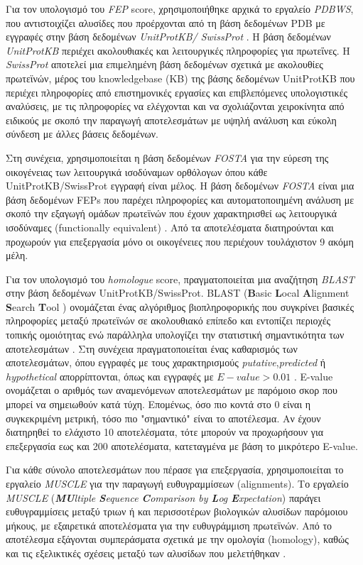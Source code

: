 \begin{itemize}
    \medskip
    Για τον υπολογισμό του \textit{FEP} score, χρησιμοποιήθηκε αρχικά το εργαλείο \textit{PDBWS}, που αντιστοιχίζει αλυσίδες που προέρχονται από τη βάση δεδομένων PDB με εγγραφές στην βάση δεδομένων \textit{UnitProtKB/ SwissProt} \cite{Martin2005}. Η βάση δεδομένων \textit{UnitProtKB} περιέχει ακολουθιακές και λειτουργικές πληροφορίες για πρωτεΐνες. Η \textit{SwissProt} αποτελεί μια επιμελημένη βάση δεδομένων σχετικά με ακολουθίες πρωτεϊνών, μέρος του knowledgebase (KB) της βάσης δεδομένων UnitProtKB που περιέχει πληροφορίες από επιστημονικές εργασίες και επιβλεπόμενες υπολογιστικές αναλύσεις, με τις πληροφορίες να ελέγχονται και να σχολιάζονται χειροκίνητα από ειδικούς με σκοπό την παραγωγή αποτελεσμάτων με υψηλή ανάλυση και εύκολη σύνδεση με άλλες βάσεις δεδομένων. 
    
    Στη συνέχεια, χρησιμοποιείται η βάση δεδομένων \textit{FOSTA} για την εύρεση της οικογένειας των λειτουργικά ισοδύναμων ορθόλογων όπου κάθε UnitProtKB/SwissProt εγγραφή είναι μέλος. Η βάση δεδομένων \textit{FOSTA} είναι μια βάση δεδομένων FEPs που παρέχει πληροφορίες και αυτοματοποιημένη ανάλυση με σκοπό την εξαγωγή ομάδων πρωτεϊνών που έχουν χαρακτηρισθεί ως λειτουργικά ισοδύναμες (functionally equivalent) \cite{McMillan2008}. Από τα αποτελέσματα διατηρούνται και προχωρούν για επεξεργασία μόνο οι οικογένειες που περιέχουν τουλάχιστον 9 ακόμη μέλη.
    
    \medskip
    Για τον υπολογισμό του \textit{homologue} score, πραγματοποιείται μια αναζήτηση \textit{BLAST} στην βάση δεδομένων UnitProtKB/SwissProt. BLAST (\textbf{B}asic \textbf{L}ocal \textbf{A}lignment \textbf{S}earch \textbf{T}ool ) ονομάζεται ένας αλγόριθμος βιοπληροφορικής που συγκρίνει βασικές πληροφορίες μεταξύ πρωτεϊνών σε ακολουθιακό επίπεδο και εντοπίζει περιοχές τοπικής ομοιότητας ενώ παράλληλα υπολογίζει την στατιστική σημαντικότητα των αποτελεσμάτων \cite{Altschul1990}. Στη συνέχεια πραγματοποιείται ένας καθαρισμός των αποτελεσμάτων, όπου εγγραφές με τους χαρακτηρισμούς \textit{putative},\textit{predicted} ή \textit{hypothetical} απορρίπτονται, όπως και εγγραφές με $E-value > 0.01$ . E-value ονομάζεται ο αριθμός των αναμενόμενων αποτελεσμάτων με παρόμοιο σκορ που μπορεί να σημειωθούν κατά τύχη. Επομένως, όσο πιο κοντά στο 0 είναι η συγκεκριμένη μετρική, τόσο πιο "σημαντικό" είναι το αποτέλεσμα.  Αν έχουν διατηρηθεί το ελάχιστο 10 αποτελέσματα, τότε μπορούν να προχωρήσουν για επεξεργασία εως και 200 αποτελέσματα, κατεταγμένα με βάση το μικρότερο E-value.
    
    \medskip
    Για κάθε σύνολο αποτελεσμάτων που πέρασε για επεξεργασία, χρησιμοποιείται το εργαλείο \textit{MUSCLE} για την παραγωγή ευθυγραμμίσεων (alignments). Το εργαλείο \textit{MUSCLE} (\textit{\textbf{MU}ltiple \textbf{S}equence \textbf{C}ompari\-son by \textbf{L}og \textbf{E}xpectation}) παράγει ευθυγραμμίσεις μεταξύ τριων ή και περισσοτέρων βιολογικών αλυσίδων παρόμοιου μήκους, με εξαιρετικά αποτελέσματα για την ευθυγράμμιση πρωτεϊνών. Από το αποτέλεσμα εξάγονται συμπεράσματα σχετικά με την ομολογία (homology), καθώς και τις εξελικτικές σχέσεις μεταξύ των αλυσίδων που μελετήθηκαν \cite{Edgar2004}. 
    

\end{itemize}
